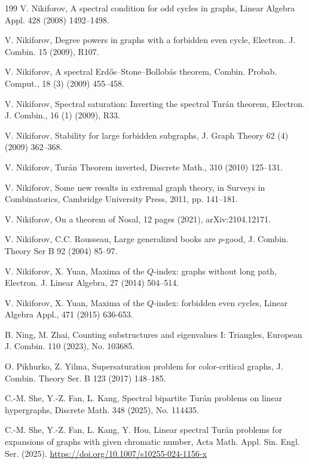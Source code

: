 \documentclass[11pt,a4paper]{article}
\theoremstyle{plain}
\theoremstyle{definition}
\begin{document}
\begin{thebibliography}{199}
V. Nikiforov, 
A spectral condition for odd cycles in graphs, 
Linear Algebra Appl. 428 (2008) 1492--1498.

V. Nikiforov,
Degree powers in graphs with a forbidden even cycle,
Electron. J. Combin. 15 (2009), R107.

 V. Nikiforov, A spectral  Erd\H{o}s--Stone--Bollob\'as theorem,  
{Combin. Probab. Comput.}, 18 (3) (2009) 455--458.

 V. Nikiforov, Spectral saturation: Inverting the spectral Tur\'an theorem,  {Electron. J. Combin.},
16 (1) (2009), R33.


V. Nikiforov, 
Stability for large forbidden subgraphs,  
J. Graph Theory 62  (4) (2009)  362--368.  

 V. Nikiforov, Tur\'an Theorem inverted,  
{Discrete Math.}, 310 (2010) 125--131.


V. Nikiforov, 
Some new results in extremal graph theory, 
in Surveys in Combinatorics, 
Cambridge University Press, 2011, pp. 141--181.

 V. Nikiforov,  On a theorem of Nosal, 
 12 pages (2021), arXiv:2104.12171. 

V. Nikiforov, C.C. Rousseau, Large generalized books are $p$-good,
J. Combin. Theory Ser B 92 (2004) 85--97.

 V. Nikiforov, X. Yuan, 
Maxima of the $Q$-index: graphs without long path,  
{Electron. J. Linear Algebra}, 27 (2014) 504--514.

V. Nikiforov, X. Yuan, 
Maxima of the $Q$-index: forbidden even cycles,  
{Linear Algebra Appl.}, 471 (2015) 636-653.


B. Ning, M. Zhai, Counting substructures and eigenvalues I: Triangles,
European J. Combin.  110 (2023), No. 103685.

O. Pikhurko, Z. Yilma, 
Supersaturation problem for color-critical graphs, 
J. Combin. Theory Ser. B 123 (2017) 148--185.


C.-M. She, Y.-Z. Fan, L. Kang,
Spectral bipartite Tur\'{a}n problems on linear hypergraphs, 
Discrete Math. 348 (2025), No. 114435. 

C.-M. She, Y.-Z. Fan, L. Kang, Y. Hou, 
Linear spectral Tur\'{a}n problems for expansions of graphs with given chromatic number, Acta Math. Appl. Sin. Engl. Ser. (2025). \url{https://doi.org/10.1007/s10255-024-1156-x} 


\end{thebibliography}
\end{document}
